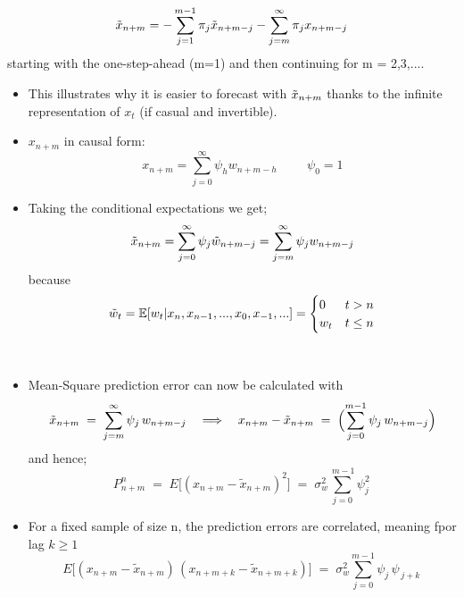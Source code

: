 \documentclass{article}
\begin{document}
    \begin{equation*}
        \Tilde{x}_{n+m} = - \sum_{j=1}^{m-1} \pi_j \Tilde{x}_{n+m - j} - \sum_{j=m}^\infty \pi_j x_{n+m-j}
    \end{equation*}
    starting with the one-step-ahead (m=1) and then continuing for m = 2,3,....
\begin{itemize}
    \item This illustrates why it is easier to forecast with $\Tilde{x}_{n+m}$ thanks to the infinite representation of $x_t$ (if casual and invertible). 
    \item $x_{n+m}$ in causal form:
    \begin{equation*}
        x_{n+m} = \sum_{j=0}^\infty \psi_h w_{n+m-h} \hspace{1cm} \psi_0 = 1
    \end{equation*}
    \item Taking the conditional expectations we get;
    \begin{equation*}
        \Tilde{x}_{n+m} = \sum_{j=0}^\infty \psi_j \Tilde{w}_{n+m-j} = \sum_{j=m}^\infty \psi_j w_{n+m-j}
    \end{equation*}
    because
    \begin{equation*}
        \Tilde{w}_t = \mathbb{E}[w_t|x_n, x_{n-1}, ..., x_0, x_{-1},...] = \begin{cases}
            0 &t > n\\
            w_t &t \leq n
        \end{cases}
    \end{equation*}
\end{itemize}    

\\


\begin{itemize}
    \item Mean-Square prediction error can now be calculated with 
    \begin{equation*}
\tilde{x}_{n+m} \;=\; \sum_{j=m}^{\infty} \psi_{j}\,w_{n+m-j}
\quad\Longrightarrow\quad
x_{n+m} - \tilde{x}_{n+m} \;=\; \Bigl(\sum_{j=0}^{m-1} \psi_{j}\,w_{n+m-j}\Bigr)
    \end{equation*}
    and hence;
    \begin{equation*}
P^n_{n+m} \;=\; E\bigl[(x_{n+m} - \tilde{x}_{n+m})^2\bigr]
\;=\; \sigma_w^2 \sum_{j=0}^{\,m-1} \psi_j^2 \,
    \end{equation*}
    \item For a fixed sample of size n, the prediction errors are correlated, meaning fpor lag $k \geq 1$
    \begin{equation*}
E\bigl[(x_{n+m} - \tilde{x}_{n+m}) \,(x_{n+m+k} - \tilde{x}_{n+m+k})\bigr]
\;=\; \sigma_w^2 \sum_{j=0}^{m-1} \psi_j \,\psi_{\,j+k}\,
    \end{equation*}
\end{itemize}
\end{document}

